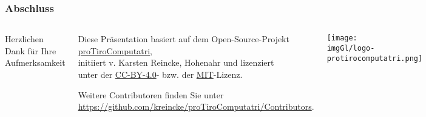 \begin{frame}
  \frametitle{Abschluss}
  \begin{columns}
      Herzlichen Dank für Ihre Aufmerksamkeit
      \vspace{3cm}
    \begin{footnotesize}Diese Präsentation basiert auf dem Open-Source-Projekt \href{https://github.com/kreincke/proTiroComputatri}{proTiroComputatri},\\
      initiiert v. Karsten Reincke, Hohenahr und lizenziert\\
      unter der \href{https://creativecommons.org/licenses/by/4.0/}{CC-BY-4.0}- bzw. der \href{https://github.com/kreincke/proTiroComputatri/LICENSE.MIT.md}{MIT}-Lizenz. 
    
    Weitere Contributoren finden Sie unter \\
    \tiny{\href{https://github.com/kreincke/proTiroComputatri/Contributors}{https://github.com/kreincke/proTiroComputatri/Contributors}}.
    \end{footnotesize}

    \vspace{0.2cm}
    \texttt{[image: \\imgGl/logo-protirocomputatri.png]}
  \end{columns}

\end{frame}